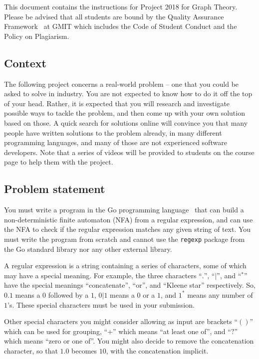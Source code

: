 \documentclass[12pt, a4paper]{article}
\title{\projectname}
\author{\modulename}
\date{Due: \duedate}
\newcommand{\modulename}{Graph Theory}
\newcommand{\projectyear}{2018}
\newcommand{\projectname}{Project \projectyear}
\begin{document}
\maketitle

\noindent
This document contains the instructions for \projectname{} for \modulename{}.
Please be advised that all students are bound by the Quality Assurance Framework~\cite{gmitqaf} at GMIT which includes the Code of Student Conduct and the Policy on Plagiarism.

\subsection*{Context}
The following project concerns a real-world problem -- one that you could be asked to solve in industry.
You are not expected to know how to do it off the top of your head.
Rather, it is expected that you will research and investigate possible ways to tackle the problem, and then come up with your own solution based on those.
A quick search for solutions online will convince you that many people have written solutions to the problem already, in many different programming languages, and many of those are not experienced software developers.
Note that a series of videos will be provided to students on the course page to help them with the project.

\subsection*{Problem statement}
You must write a program in the Go programming language~\cite{golang} that can build a non-deterministic finite automaton (NFA) from a regular expression, and can use the NFA to check if the regular expression matches any given string of text.
You must write the program from scratch and cannot use the \texttt{regexp} package from the Go standard library nor any other external library.

A regular expression is a string containing a series of characters, some of which may have a special meaning.
For example, the three characters ``$.$'', ``$|$'', and ``$^*$'' have the special meanings ``concatenate'', ``or'', and ``Kleene star'' respectively.
So, $0.1$ means a $0$ followed by a $1$, $0|1$ means a $0$ or a $1$, and $1^*$ means any number of $1$'s.
These special characters must be used in your submission.

Other special characters you might consider allowing as input are brackets ``$()$'' which can be used for grouping, ``$+$'' which means ``at least one of'', and ``$?$'' which means ``zero or one of''.
You might also decide to remove the concatenation character, so that $1.0$ becomes $10$, with the concatenation implicit.
\end{document}
